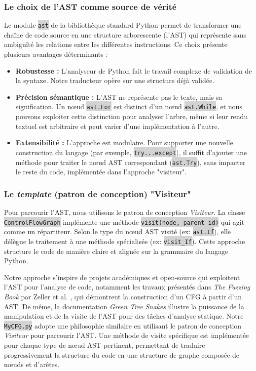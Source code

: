 \documentclass[11pt,a4paper]{article}
\let\cite\parencite
\newcommand{\code}[1]{\colorbox{lightgray}{\texttt{\small #1}}}
\begin{document}
\subsubsection{Le choix de l'AST comme source de vérité}
Le module \code{ast} de la bibliothèque standard Python permet de transformer une chaîne de code source en une structure arborescente (l'AST) qui représente sans ambiguïté les relations entre les différentes instructions. Ce choix présente plusieurs avantages déterminants :
\begin{itemize}
    \item \textbf{Robustesse :} L'analyseur de Python fait le travail complexe de validation de la syntaxe. Notre traducteur opère sur une structure déjà validée.
    \item \textbf{Précision sémantique :} L'AST ne représente pas le texte, mais sa signification. Un nœud \code{ast.For} est distinct d'un nœud \code{ast.While}, et nous pouvons exploiter cette distinction pour analyser l'arbre, même si leur rendu textuel est arbitraire et peut varier d'une implémentation à l'autre.  
    \item \textbf{Extensibilité :} L'approche est modulaire. Pour supporter une nouvelle construction du langage (par exemple, \code{try...except}), il suffit d'ajouter une méthode pour traiter le nœud AST correspondant (\code{ast.Try}), sans impacter le reste du code, implémentée dans l'approche "visiteur".
\end{itemize}

\subsubsection{Le \textit{template} (patron de conception) "Visiteur"}
Pour parcourir l'AST, nous utilisons le patron de conception \textit{Visiteur}. La classe \code{ControlFlowGraph} implémente une méthode \code{visit(node, parent\_id)} qui agit comme un répartiteur. Selon le type du nœud AST visité (ex: \code{ast.If}), elle délègue le traitement à une méthode spécialisée (ex: \code{visit\_If}). Cette approche structure le code de manière claire et alignée sur la grammaire du langage Python.

Notre approche s'inspire de projets académiques et open-source qui exploitent l'AST pour l'analyse de code, notamment les travaux présentés dans \textit{The Fuzzing Book} par Zeller et al. \cite{fuzzingbook}, qui démontrent la construction d'un CFG à partir d'un AST. De même, la documentation \textit{Green Tree Snakes} \cite{greentreesnakes} illustre la puissance de la manipulation et de la visite de l'AST pour des tâches d'analyse statique. Notre \code{MyCFG.py} adopte une philosophie similaire en utilisant le patron de conception \textit{Visiteur} pour parcourir l'AST. Une méthode de visite spécifique est implémentée pour chaque type de nœud AST pertinent, permettant de traduire progressivement la structure du code en une structure de graphe composée de nœuds et d'arêtes.
\clearpage
\end{document}
